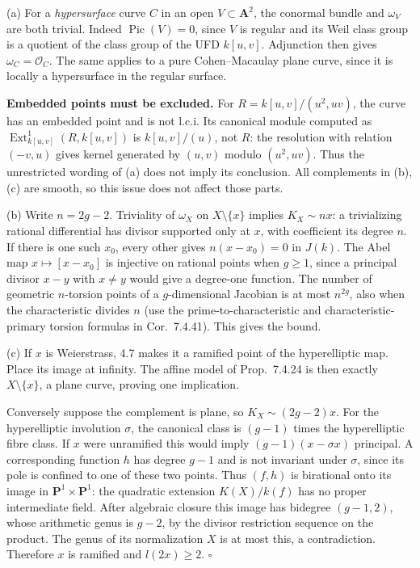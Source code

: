 \documentclass[11pt]{article}
\let\chapterexercise\exercise
\renewcommand{\exercise}[2]{\Needspace{8\baselineskip}\chapterexercise{#1}{#2}}
\begin{document}
\pf
(a) For a \emph{hypersurface} curve $C$ in an open $V\subset\mathbf A^2$, the conormal bundle and $\omega_V$ are both trivial. Indeed $\operatorname{Pic}(V)=0$, since $V$ is regular and its Weil class group is a quotient of the class group of the UFD $k[u,v]$. Adjunction then gives $\omega_C=\mathcal O_C$. The same applies to a pure Cohen--Macaulay plane curve, since it is locally a hypersurface in the regular surface.

\textbf{Embedded points must be excluded.} For $R=k[u,v]/(u^2,uv)$, the curve has an embedded point and is not l.c.i. Its canonical module computed as $\operatorname{Ext}^1_{k[u,v]}(R,k[u,v])$ is $k[u,v]/(u)$, not $R$: the resolution with relation $(-v,u)$ gives kernel generated by $(u,v)$ modulo $(u^2,uv)$. Thus the unrestricted wording of (a) does not imply its conclusion. All complements in (b),(c) are smooth, so this issue does not affect those parts.

(b) Write $n=2g-2$. Triviality of $\omega_X$ on $X\setminus\{x\}$ implies $K_X\sim n x$: a trivializing rational differential has divisor supported only at $x$, with coefficient its degree $n$. If there is one such $x_0$, every other gives $n(x-x_0)=0$ in $J(k)$. The Abel map $x\mapsto[x-x_0]$ is injective on rational points when $g\ge1$, since a principal divisor $x-y$ with $x\ne y$ would give a degree-one function. The number of geometric $n$-torsion points of a $g$-dimensional Jacobian is at most $n^{2g}$, also when the characteristic divides $n$ (use the prime-to-characteristic and characteristic-primary torsion formulas in Cor.~7.4.41). This gives the bound.

(c) If $x$ is Weierstrass, 4.7 makes it a ramified point of the hyperelliptic map. Place its image at infinity. The affine model of Prop.~7.4.24 is then exactly $X\setminus\{x\}$, a plane curve, proving one implication.

Conversely suppose the complement is plane, so $K_X\sim(2g-2)x$. For the hyperelliptic involution $\sigma$, the canonical class is $(g-1)$ times the hyperelliptic fibre class. If $x$ were unramified this would imply $(g-1)(x-\sigma x)$ principal. A corresponding function $h$ has degree $g-1$ and is not invariant under $\sigma$, since its pole is confined to one of these two points. Thus $(f,h)$ is birational onto its image in $\mathbf P^1\times\mathbf P^1$: the quadratic extension $K(X)/k(f)$ has no proper intermediate field. After algebraic closure this image has bidegree $(g-1,2)$, whose arithmetic genus is $g-2$, by the divisor restriction sequence on the product. The genus of its normalization $X$ is at most this, a contradiction. Therefore $x$ is ramified and $l(2x)\ge2$. \hfill$\square$
\end{document}
